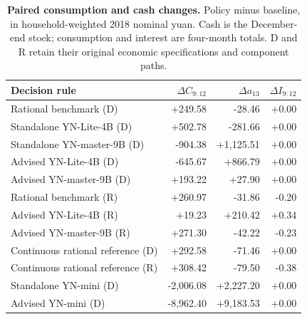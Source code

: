 \begin{table}[H]
\centering\footnotesize
\begin{tabularx}{\textwidth}{@{}Xrrr@{}}
\toprule
Decision rule & $\Delta C_{9:12}$ & $\Delta a_{13}$ & $\Delta I_{9:12}$\\
\midrule
Rational benchmark (D) & +249.58 & -28.46 & +0.00\\
Standalone YN-Lite-4B (D) & +502.78 & -281.66 & +0.00\\
Standalone YN-master-9B (D) & -904.38 & +1,125.51 & +0.00\\
Advised YN-Lite-4B (D) & -645.67 & +866.79 & +0.00\\
Advised YN-master-9B (D) & +193.22 & +27.90 & +0.00\\
\midrule
Rational benchmark (R) & +260.97 & -31.86 & -0.20\\
Advised YN-Lite-4B (R) & +19.23 & +210.42 & +0.34\\
Advised YN-master-9B (R) & +271.30 & -42.22 & -0.23\\
\midrule
Continuous rational reference (D) & +292.58 & -71.46 & +0.00\\
Continuous rational reference (R) & +308.42 & -79.50 & -0.38\\
\midrule
Standalone YN-mini (D) & -2,006.08 & +2,227.20 & +0.00\\
Advised YN-mini (D) & -8,962.40 & +9,183.53 & +0.00\\
\bottomrule
\end{tabularx}
\caption{\textbf{Paired consumption and cash changes.} Policy minus baseline, in household-weighted 2018 nominal yuan. Cash is the December-end stock; consumption and interest are four-month totals. D and R retain their original economic specifications and component paths.}
\label{hh:tab:channels}
\end{table}
\endgroup
